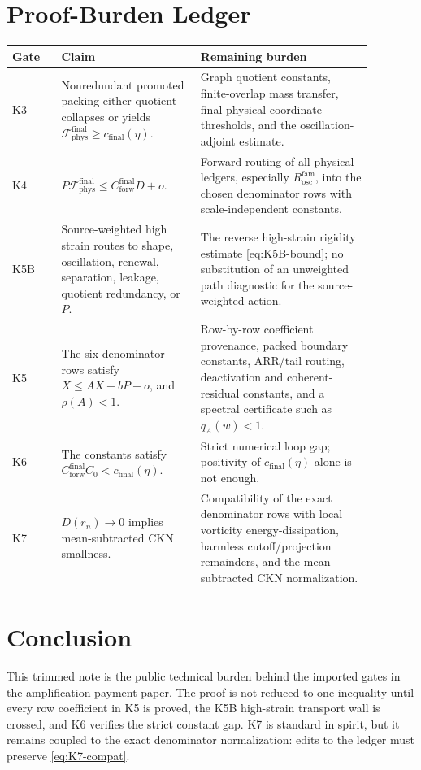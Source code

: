 \documentclass[11pt]{article}
\begin{document}
\clearpage
\section{Proof-Burden Ledger}
\label{sec:burden}

\begin{longtable}{@{}p{0.12\linewidth}p{0.34\linewidth}p{0.42\linewidth}@{}}
\toprule
\textbf{Gate} & \textbf{Claim} & \textbf{Remaining burden} \\
\midrule
\endhead
K3 &
Nonredundant promoted packing either quotient-collapses or yields
\(\mathcal F_{\mathrm{phys}}^{\mathrm{final}}\ge c_{\mathrm{final}}(\eta)\). &
Graph quotient constants, finite-overlap mass transfer, final physical
coordinate thresholds, and the oscillation-adjoint estimate. \\
\addlinespace
K4 &
\(P\mathcal F_{\mathrm{phys}}^{\mathrm{final}}\le
C_{\mathrm{forw}}^{\mathrm{final}}D+o\). &
Forward routing of all physical ledgers, especially \(R_{\mathrm{osc}}^{\mathrm{fam}}\),
into the chosen denominator rows with scale-independent constants. \\
\addlinespace
K5B &
Source-weighted high strain routes to shape, oscillation, renewal, separation,
leakage, quotient redundancy, or \(P\). &
The reverse high-strain rigidity estimate
\eqref{eq:K5B-bound}; no substitution of an unweighted path diagnostic for the
source-weighted action. \\
\addlinespace
K5 &
The six denominator rows satisfy \(X\le AX+bP+o\), and \(\rho(A)<1\). &
Row-by-row coefficient provenance, packed boundary constants, ARR/tail routing,
deactivation and coherent-residual constants, and a spectral certificate such
as \(q_A(w)<1\). \\
\addlinespace
K6 &
The constants satisfy
\(C_{\mathrm{forw}}^{\mathrm{final}}C_0<c_{\mathrm{final}}(\eta)\). &
Strict numerical loop gap; positivity of \(c_{\mathrm{final}}(\eta)\) alone is
not enough. \\
\addlinespace
K7 &
\(D(r_n)\to0\) implies mean-subtracted CKN smallness. &
Compatibility of the exact denominator rows with local vorticity
energy-dissipation, harmless cutoff/projection remainders, and the
mean-subtracted CKN normalization. \\
\bottomrule
\end{longtable}

\section{Conclusion}
\label{sec:conclusion}

This trimmed note is the public technical burden behind the imported gates in
the amplification-payment paper.  The proof is not reduced to one inequality
until every row coefficient in K5 is proved, the K5B high-strain transport wall
is crossed, and K6 verifies the strict constant gap.  K7 is standard in spirit,
but it remains coupled to the exact denominator normalization: edits to the
ledger must preserve \eqref{eq:K7-compat}.
\end{document}
